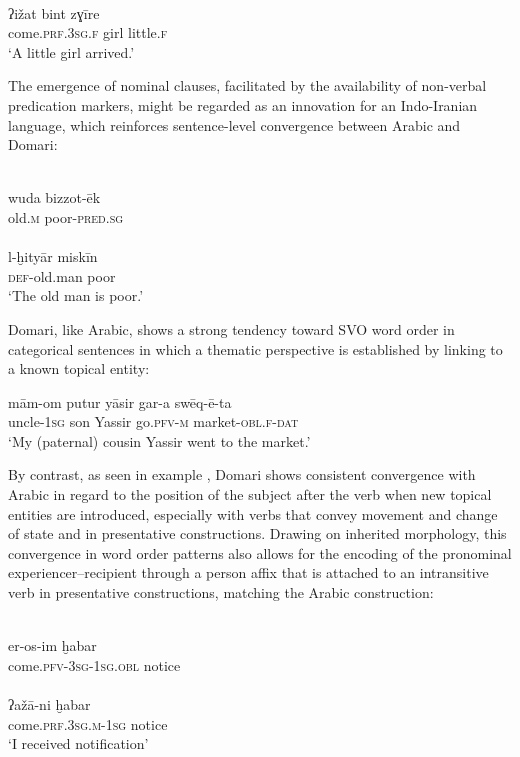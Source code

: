 \documentclass[output=paper]{langsci/langscibook}
\begin{document}
\ex\label{ex:matras:}
\\
\gll ʔižat bint zɣīre  \\
       come.\textsc{prf.3sg.f} girl little.\textsc{f}\\
\glt   ‘A little girl arrived.’ \label{girlc}
\z
\z

The emergence of nominal clauses, facilitated by the availability of non-verbal predication markers, might be regarded as an innovation for an Indo-Iranian language, which reinforces sentence-level convergence between Arabic and Domari:

\ea\label{ex:matras:}
\ea
{}\\
\gll wuda bizzot-ēk  \\
     old.\textsc{m} poor-\textsc{pred.sg}\\
     
\ex {}\\
\gll l-ḫityār miskīn  \\
     \textsc{def}{}-old.man poor\\
\glt ‘The old man is poor.’
\z
\z

Domari, like Arabic, shows a strong tendency toward SVO word order in categorical sentences in which a thematic perspective is established by linking to a known topical entity:

\ea \gll mām-om putur yāsir gar-a swēq-ē-ta\\
         uncle-\textsc{1sg} son Yassir go.\textsc{pfv-m} market-\textsc{obl.f-dat}\\
\glt     ‘My (paternal) cousin Yassir went to the market.’
\z

By contrast, as seen in example , Domari shows consistent convergence with Arabic in regard to the position of the subject after the verb when new topical entities are introduced, especially with verbs that convey movement and change of state and in presentative constructions. Drawing on inherited morphology, this convergence in word order patterns also allows for the encoding of the pronominal experiencer--recipient through a person affix that is attached to an intransitive verb in presentative constructions, matching the Arabic construction:

\ea\label{ex:matras:}
\ea
{}\\
\gll er-os-im ḫabar    \\
     come.\textsc{pfv-3sg-1sg.obl}  notice\\
\ex
{}\\
\gll  ʔažā-ni  ḫabar  \\
     come.\textsc{prf.3sg.m-1sg} notice\\
\glt ‘I received notification’
\z
\z
\end{document}
